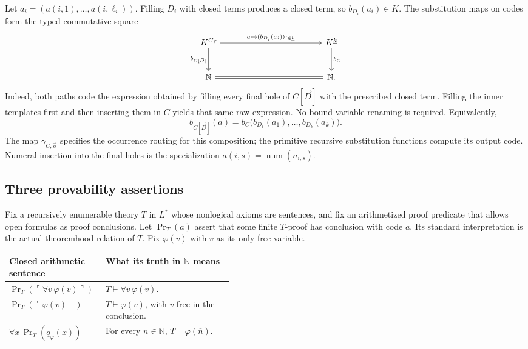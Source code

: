 \documentclass[11pt]{article}
\newcommand{\finord}[1]{\underline{#1}}
\newcommand{\N}{\mathbb N}
\newcommand{\num}{\operatorname{num}}
\newcommand{\Prov}{\operatorname{Pr}}
\newcommand{\quo}[1]{\ulcorner #1\urcorner}
\newcommand{\bn}[1]{\overline{#1}}
\theoremstyle{definition}
\begin{document}
Let $a_i=(a(i,1),\ldots,a(i,\ell_i))$. Filling $D_i$ with closed
terms produces a closed term, so $b_{D_i}(a_i)\in K$. The substitution
maps on codes form the typed commutative square
\[
\begin{tikzcd}[column sep=12em,row sep=large]
 K^{C_{\vec\ell}}
   \arrow[r,"{a\mapsto(b_{D_i}(a_i))_{i\in\finord k}}"]
   \arrow[d,"b_{C[\vec D]}"'] &
 K^{\finord k} \arrow[d,"b_C"]\\
 \N \arrow[r,equal] & \N.
\end{tikzcd}
\]
Indeed, both paths code the expression obtained by filling every final
hole of $C[\vec D]$ with the prescribed closed term. Filling the inner
templates first and then inserting them in $C$ yields that same raw
expression. No bound-variable renaming is required. Equivalently,
\begin{equation}\label{eq:feferman-template-composition}
 b_{C[\vec D]}(a)
   =b_C\bigl(b_{D_1}(a_1),\ldots,b_{D_k}(a_k)\bigr).
\end{equation}
The map $\gamma_{C,\vec o}$ specifies the occurrence routing for this
composition; the primitive recursive substitution functions compute its
output code. Numeral insertion into the final holes is the specialization
$a(i,s)=\num(n_{i,s})$.


\subsection{Three provability assertions}

Fix a recursively enumerable theory $T$ in $L^{*}$ whose nonlogical
axioms are sentences, and fix an arithmetized proof predicate that
allows open formulas as proof conclusions. Let $\Prov_T(a)$ assert
that some finite $T$-proof has conclusion with code $a$. Its standard
interpretation is the actual theoremhood relation of $T$.
Fix $\varphi(v)$ with $v$ as its only free variable.

\begin{center}
\renewcommand{\arraystretch}{1.35}
\begin{tabularx}{\linewidth}{@{}p{0.43\linewidth}X@{}}
\toprule
Closed arithmetic sentence & What its truth in $\N$ means\\
\midrule
$\Prov_T(\quo{\forall v\,\varphi(v)})$
  & $T\vdash\forall v\,\varphi(v)$.\\
$\Prov_T(\quo{\varphi(v)})$
  & $T\vdash\varphi(v)$, with $v$ free in the conclusion.\\
$\forall x\,\Prov_T(q_\varphi(x))$
  & For every $n\in\N$, $T\vdash\varphi(\bn n)$.\\
\bottomrule
\end{tabularx}
\end{center}
\end{document}
